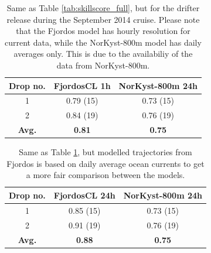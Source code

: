\begin{table}
\begin{center}
  \begin{tabular}{ | c | c | c |}
    \hline
    {\bf Drop no.} & {\bf FjordosCL 1h} & {\bf NorKyst-800m 24h} \\ \hline
    1 & 0.79 (15) & 0.73 (15) \\ 
    2 & 0.84 (19) & 0.76 (19) \\ \hline
    {\bf Avg.} & {\bf 0.81} & {\bf 0.75} \\
    \hline
  \end{tabular}
\caption{Same as Table \ref{tab:skillscore_full}, but for the drifter release during the September 2014 cruise. Please note that the Fjordos model has hourly resolution for current data, while the NorKyst-800m model has daily averages only. This is due to the availabiliy of the data from NorKyst-800m.}
\label{tab:skillscore2014_1h}
\end{center}
\end{table}
\begin{table}
\begin{center}
  \begin{tabular}{ | c | c | c |}
    \hline
    {\bf Drop no.} & {\bf FjordosCL 24h} & {\bf NorKyst-800m 24h} \\ \hline
    1 & 0.85 (15) & 0.73 (15) \\ 
    2 & 0.91 (19) & 0.76 (19) \\ \hline
    {\bf Avg.} & {\bf 0.88} & {\bf 0.75} \\
    \hline
  \end{tabular}
\caption{Same as Table \ref{tab:skillscore2014_1h}, but modelled trajectories from Fjordos is based on daily average ocean currents to get a more fair comparison between the models.}
\label{tab:skillscore2014_24h}
\end{center}
\end{table}


